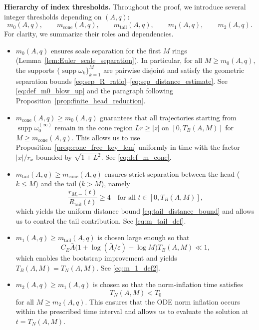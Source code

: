 \documentclass[reqno,11pt]{amsart}
\newcommand{\supp}{\operatorname{supp}}
\begin{document}
\medskip
\noindent\textbf{Hierarchy of index thresholds.}
Throughout the proof, we introduce several integer thresholds depending on $(A,q)$:
\[
m_0(A,q), \qquad m_{\mathrm{cone}}(A,q), \qquad m_{\mathrm{tail}}(A,q), \qquad m_1(A,q), \qquad m_2(A,q).
\]
For clarity, we summarize their roles and dependencies.

\begin{itemize}
\item[(i)] $m_0(A,q)$ ensures scale separation for the first $M$ rings (Lemma~\ref{lem:Euler_scale_separation}). In particular, for all $M \ge m_0(A,q)$, the supports $\{\supp \omega_k\}_{k=1}^M$ are pairwise disjoint and satisfy the geometric separation bounds \eqref{eq:sep_R_ratio}--\eqref{eq:sep_distance_estimate}. See \eqref{eq:def_m0_blow_up} and the paragraph following Proposition~\ref{prop:finite_head_reduction}.

\item[(ii)] $m_{\mathrm{cone}}(A,q) \ge m_0(A,q)$ guarantees that all trajectories starting from $\supp \omega_0^{(\infty)}$ remain in the cone region $L r \ge |z|$ on $[0,T_B(A,M)]$ for $M \ge m_{\mathrm{cone}}(A,q)$. This allows us to use Proposition~\ref{prop:cone_free_key_lem} uniformly in time with the factor $|x|/r_x$ bounded by $\sqrt{1+L^2}$. See \eqref{eq:def_m_cone}.

\item[(iii)] $m_{\mathrm{tail}}(A,q) \ge m_{\mathrm{cone}}(A,q)$ ensures strict separation between the head ($k \le M$) and the tail ($k > M$), namely
\[
\frac{r_{M,-}(t)}{R_{\mathrm{tail}}(t)} \ge 4
\quad \text{for all } t \in [0,T_B(A,M)],
\]
which yields the uniform distance bound \eqref{eq:tail_distance_bound} and allows us to control the tail contribution. See \eqref{eq:m_tail_def}.

\item[(iv)] $m_1(A,q) \ge m_{\mathrm{tail}}(A,q)$ is chosen large enough so that
\[
C_E \bar A \bigl(1+\log(\bar A/\varepsilon)+\log M\bigr) T_B(A,M) \ll 1,
\]
which enables the bootstrap improvement and yields $T_B(A,M)=T_N(A,M)$. See \eqref{eq:m_1_def2}.

\item[(v)] $m_2(A,q) \ge m_1(A,q)$ is chosen so that the norm-inflation time satisfies
\[
T_N(A,M) < T_0 
\]
for all $M \ge m_2(A,q)$. This ensures that the ODE norm inflation occurs within the prescribed time interval and allows us to evaluate the solution at $t = T_N(A,M)$.

\end{itemize}
\end{document}
